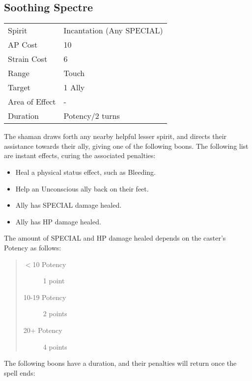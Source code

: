 \documentclass[11pt,a4paper,twocolumn]{book}
\begin{document}
\subsection*{Soothing Spectre}
{
	\begin{tabu} to 75mm{| X[l,4] | X[l,7] |}
		\hline
		Spirit         & Incantation (Any SPECIAL) \\
		AP Cost        & 10                        \\
		Strain Cost    & 6                         \\
		Range          & Touch                     \\
		Target         & 1 Ally                    \\
		Area of Effect & -                         \\
		Duration       & Potency/2 turns           \\ \hline
	\end{tabu}
	
}

\medskip

The shaman draws forth any nearby helpful lesser spirit, and directs their assistance towards their ally, giving one of the following boons. The following list are instant effects, curing the associated penalties:

\begin{itemize}
	\item Heal a physical status effect, such as Bleeding.
	\item Help an Unconscious ally back on their feet.
	\item Ally has SPECIAL damage healed.
	\item Ally has HP damage healed.
\end{itemize}

The amount of SPECIAL and HP damage healed depends on the caster's Potency as follows:

\begin{quote}
	\begin{description}
		\item[$<$10 Potency] 	1 point
		\item[10-19 Potency] 	2 points
		\item[20+ Potency] 	    4 points
	\end{description}
\end{quote}

The following boons have a duration, and their penalties will return once the spell ends:
\end{document}
